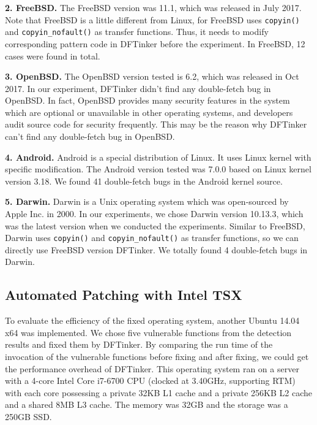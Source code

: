 \documentclass[10pt]{llncs}
\begin{document}
\textbf{2. FreeBSD.}
The FreeBSD version was 11.1, which was released in July 2017. Note that FreeBSD is a little different from Linux, for FreeBSD uses \verb:copyin(): and \verb:copyin_nofault(): as transfer functions. Thus, it needs to modify corresponding pattern code in DFTinker before the experiment. In FreeBSD, 12 cases were found in total.



\textbf{3. OpenBSD.}
The OpenBSD version tested is 6.2, which was released in Oct 2017. In our experiment, DFTinker didn't find any double-fetch bug in OpenBSD. In fact, OpenBSD provides many security features in the system which are optional or unavailable in other operating systems, and developers audit source code for security frequently. This may be the reason why DFTinker can't find any double-fetch bug in OpenBSD.

\textbf{4. Android.}
Android is a special distribution of Linux. It uses Linux kernel with specific modification. The Android version tested was 7.0.0 based on Linux kernel version 3.18. We found 41 double-fetch bugs in the Android kernel source.

\textbf{5. Darwin.}
Darwin is a Unix operating system which was open-sourced by Apple Inc. in 2000. In our experiments, we chose Darwin version 10.13.3, which was the latest version when we conducted the experiments. Similar to FreeBSD, Darwin uses \verb:copyin(): and \verb:copyin_nofault(): as transfer functions, so we can directly use FreeBSD version DFTinker. We totally found 4 double-fetch bugs in Darwin.

\subsection{Automated Patching with Intel TSX}
\label{evalue2}




To evaluate the efficiency of the fixed operating system, another Ubuntu 14.04 x64 was implemented. We chose five vulnerable functions from the detection results and fixed them by DFTinker. By comparing the run time of the invocation of the vulnerable functions before fixing and after fixing, we could get the performance overhead of DFTinker. This operating system ran on a server with a 4-core Intel Core i7-6700 CPU (clocked at 3.40GHz, supporting RTM) with each core possessing a private 32KB L1 cache and a private 256KB L2 cache and a shared 8MB L3 cache. The memory was 32GB and the storage was a 250GB SSD.
\end{document}
